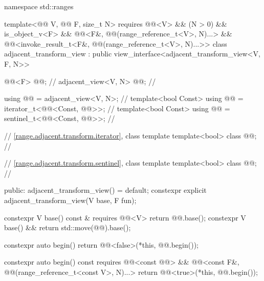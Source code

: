 %
%
%
\begin{codeblock}
namespace std::ranges {
  template<@@ V, @@ F, size_t N>
    requires @@<V> && (N > 0) && is_object_v<F> &&
             @@<F&, @@(range_reference_t<V>, N)...> &&
             @@<invoke_result_t<F&, @@(range_reference_t<V>, N)...>>
  class adjacent_transform_view : public view_interface<adjacent_transform_view<V, F, N>> {
    @@<F> @@;                        // \expos
    adjacent_view<V, N> @@;                 // \expos

    using @@ = adjacent_view<V, N>;      // \expos
    template<bool Const>
      using @@ = iterator_t<@@<Const, @@>>;         // \expos
    template<bool Const>
      using @@ = sentinel_t<@@<Const, @@>>;         // \expos

    // \ref{range.adjacent.transform.iterator}, class template 
    template<bool> class @@;              // \expos

    // \ref{range.adjacent.transform.sentinel}, class template 
    template<bool> class @@;              // \expos

  public:
    adjacent_transform_view() = default;
    constexpr explicit adjacent_transform_view(V base, F fun);

    constexpr V base() const & requires @@<V> { return @@.base(); }
    constexpr V base() && { return std::move(@@).base(); }

    constexpr auto begin() {
      return @@<false>(*this, @@.begin());
    }

    constexpr auto begin() const
      requires @@<const @@> &&
               @@<const F&, @@(range_reference_t<const V>, N)...> {
      return @@<true>(*this, @@.begin());
    }

}}
\end{codeblock}
